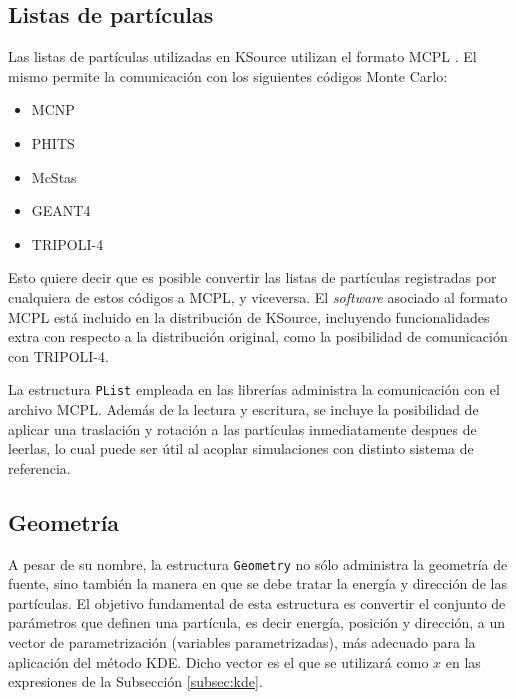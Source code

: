 \subsection{Listas de partículas}

Las listas de partículas utilizadas en KSource utilizan el formato MCPL \cite{MCPL}. El mismo permite la comunicación con los siguientes códigos Monte Carlo:
\begin{itemize}
	\item MCNP
	\item PHITS
	\item McStas
	\item GEANT4
	\item TRIPOLI-4
\end{itemize}
Esto quiere decir que es posible convertir las listas de partículas registradas por cualquiera de estos códigos a MCPL, y viceversa. El \emph{software} asociado al formato MCPL está incluido en la distribución de KSource, incluyendo funcionalidades extra con respecto a la distribución original, como la posibilidad de comunicación con TRIPOLI-4.

La estructura \verb|PList| empleada en las librerías administra la comunicación con el archivo MCPL. Además de la lectura y escritura, se incluye la posibilidad de aplicar una traslación y rotación a las partículas inmediatamente despues de leerlas, lo cual puede ser útil al acoplar simulaciones con distinto sistema de referencia.

\subsection{Geometría}

A pesar de su nombre, la estructura \verb|Geometry| no sólo administra la geometría de fuente, sino también la manera en que se debe tratar la energía y dirección de las partículas. El objetivo fundamental de esta estructura es convertir el conjunto de parámetros que definen una partícula, es decir energía, posición y dirección, a un vector de parametrización (variables parametrizadas), más adecuado para la aplicación del método KDE. Dicho vector es el que se utilizará como $x$ en las expresiones de la Subsección \ref{subsec:kde}.

